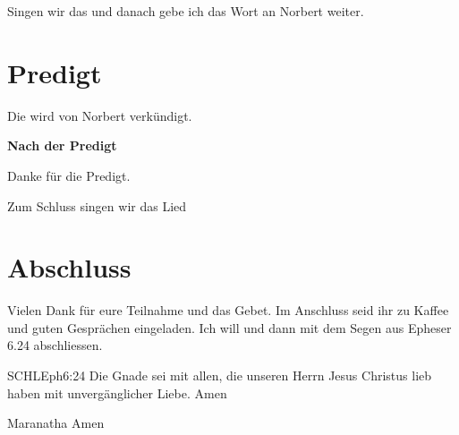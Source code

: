 \documentclass{../../inc/mybib}
\begin{document}
Singen wir das  und danach gebe ich das Wort an Norbert weiter.

\section{Predigt}
Die wird von Norbert verkündigt.

\textbf{Nach der Predigt}

Danke für die Predigt.

Zum Schluss singen wir das Lied 

\section{Abschluss}
Vielen Dank für eure Teilnahme und das Gebet. Im Anschluss seid ihr zu Kaffee und guten Gesprächen eingeladen.
Ich will \beten{} und dann mit dem Segen aus Epheser 6.24 abschliessen.
\begin{bibelbox}{SCHL}{Eph}{6:24}
Die Gnade sei mit allen, die unseren Herrn Jesus Christus lieb haben mit unvergänglicher Liebe. Amen
\end{bibelbox}
Maranatha Amen
\end{document}
